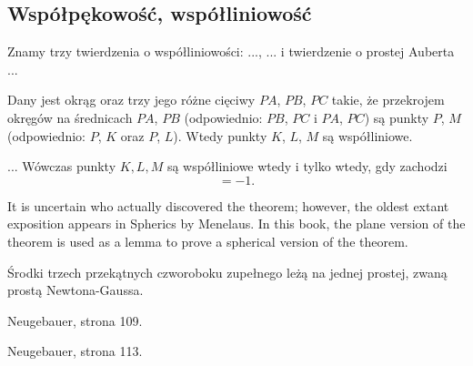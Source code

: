 %



\subsection{Współpękowość, współliniowość}

Znamy trzy twierdzenia o współliniowości: ..., ... i twierdzenie o prostej Auberta ...

\begin{proposition}
	Dany jest okrąg oraz trzy jego różne cięciwy $PA$, $PB$, $PC$ takie, że przekrojem okręgów na średnicach $PA$, $PB$ (odpowiednio: $PB$, $PC$ i $PA$, $PC$) są punkty $P$, $M$ (odpowiednio: $P$, $K$ oraz $P$, $L$).
	Wtedy punkty $K$, $L$, $M$ są współliniowe.
\end{proposition}

\begin{proposition}
	...
	Wówczas punkty $K, L, M$ są współliniowe wtedy i tylko wtedy, gdy zachodzi
	\begin{equation}
		[AMB] [BKC] [CLA] = -1.
	\end{equation}
\end{proposition}
It is uncertain who actually discovered the theorem; however, the oldest extant exposition appears in Spherics by Menelaus. In this book, the plane version of the theorem is used as a lemma to prove a spherical version of the theorem.



\begin{proposition}
	Środki trzech przekątnych czworoboku zupełnego leżą na jednej prostej, zwaną prostą Newtona-Gaussa.
\end{proposition}

\begin{proposition}
	Neugebauer, strona 109.
\end{proposition}

\begin{proposition}
	Neugebauer, strona 113.
\end{proposition}

